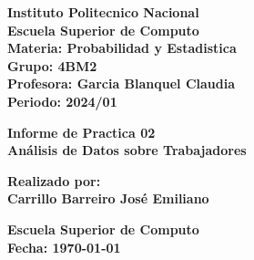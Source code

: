\documentclass{article}
\newcommand{\nombreInstituto}{Instituto Politecnico Nacional}
\newcommand{\facultad}{Escuela Superior de Computo}
\newcommand{\materia}{Probabilidad y Estadistica}
\newcommand{\grupo}{4BM2}
\newcommand{\profesora}{Garcia Blanquel Claudia}
\newcommand{\periodo}{2024/01}
\newcommand{\alumno}{Carrillo Barreiro José Emiliano}
\begin{document}
\begin{titlepage}
    \begin{center}
        \vspace*{1cm}


        \vspace{1.5cm}

        \textbf{\LARGE \nombreInstituto} \\
        \textbf{\Large \facultad} \\
        \vspace{0.5cm}
        \textbf{\large Materia: \materia} \\
        \textbf{\large Grupo: \grupo} \\
        \vspace{0.5cm}
        \textbf{\large Profesora: \profesora} \\
        \textbf{\large Periodo: \periodo} \\

        \vspace{2cm}

        \textbf{\LARGE Informe de Practica 02} \\
        \vspace{0.5cm}
        \textbf{\Large Análisis de Datos sobre Trabajadores} \\

        \vfill

        \textbf{\large Realizado por:} \\
        \textbf{\large \alumno}

        \vspace{1cm}


        \vspace{1cm}

        \textbf{\large \facultad} \\
        \textbf{\large Fecha: \today}

    \end{center}
\end{titlepage}

\tableofcontents
\newpage

\end{document}
